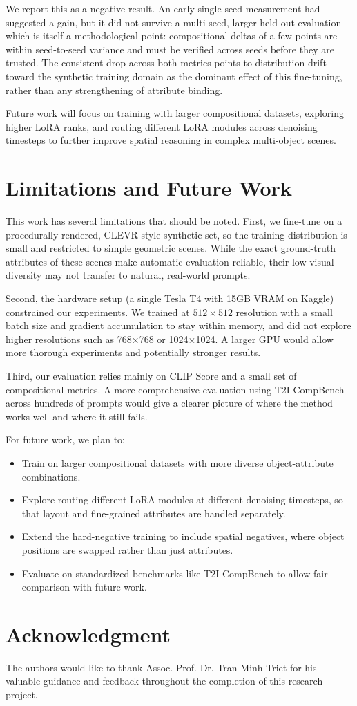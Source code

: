 \documentclass[12pt,onecolumn]{IEEEtran}
\begin{document}
We report this as a negative result. An early single-seed measurement had
suggested a gain, but it did not survive a multi-seed, larger held-out
evaluation---which is itself a methodological point: compositional deltas of a
few points are within seed-to-seed variance and must be verified across seeds
before they are trusted. The consistent drop across both metrics points to
distribution drift toward the synthetic training domain as the dominant effect
of this fine-tuning, rather than any strengthening of attribute binding.

Future work will focus on training with larger 
compositional datasets, exploring higher LoRA ranks, and routing different 
LoRA modules across denoising timesteps to further improve spatial reasoning 
in complex multi-object scenes.

\section{Limitations and Future Work}
This work has several limitations that should be noted. First, we fine-tune
on a procedurally-rendered, CLEVR-style synthetic set, so the training
distribution is small and restricted to simple geometric scenes. While the
exact ground-truth attributes of these scenes make automatic evaluation
reliable, their low visual diversity may not transfer to natural, real-world
prompts.

Second, the hardware setup (a single Tesla T4 with 15GB VRAM on Kaggle)
constrained our experiments. We trained at $512\times512$ resolution with a
small batch size and gradient accumulation to stay within memory, and did not
explore higher resolutions such as 768$\times$768 or 1024$\times$1024. A larger
GPU would allow more thorough experiments and potentially stronger results.

Third, our evaluation relies mainly on CLIP Score and a small set of 
compositional metrics. A more comprehensive evaluation using T2I-CompBench 
\cite{huang2023t2i} across hundreds of prompts would give a clearer picture 
of where the method works well and where it still fails.

For future work, we plan to:
\begin{itemize}
    \item Train on larger compositional datasets with more diverse 
    object-attribute combinations.
    \item Explore routing different LoRA modules at different denoising 
    timesteps, so that layout and fine-grained attributes are handled 
    separately.
    \item Extend the hard-negative training to include spatial negatives, 
    where object positions are swapped rather than just attributes.
    \item Evaluate on standardized benchmarks like T2I-CompBench to allow 
    fair comparison with future work.
\end{itemize}

\section*{Acknowledgment}
The authors would like to thank Assoc. Prof. Dr. Tran Minh Triet 
for his valuable guidance and feedback throughout the completion 
of this research project.

\newpage
\printbibliography
\end{document}
